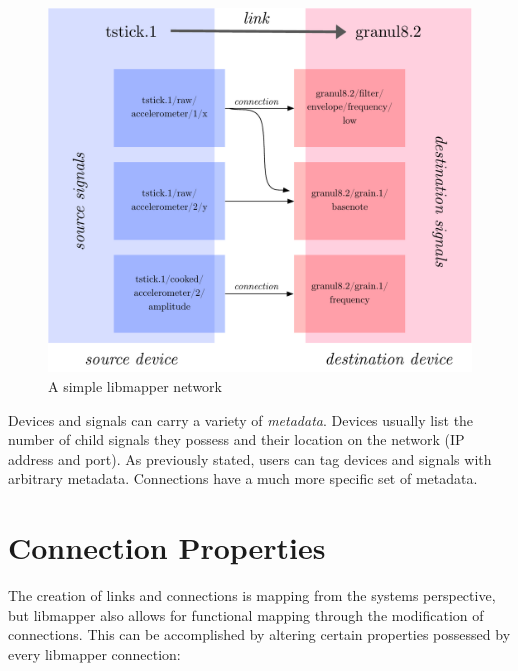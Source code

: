 \begin{figure}[!ht]
\centering
	\includegraphics[width=\textwidth]{figures/libmapper_devices}
\caption{A simple libmapper network}
\label{fig:libmapper_devices}
\end{figure}

Devices and signals can carry a variety of \emph{metadata}. Devices usually list the number of child signals they possess and their location on the network (IP address and port). As previously stated, users can tag devices and signals with arbitrary metadata. Connections have a much more specific set of metadata.


	\section{Connection Properties} %
	\label{sec:connection_properties}

The creation of links and connections is mapping from the systems perspective, but libmapper also allows for functional mapping through the modification of connections. This can be accomplished by altering certain properties possessed by every libmapper connection:

